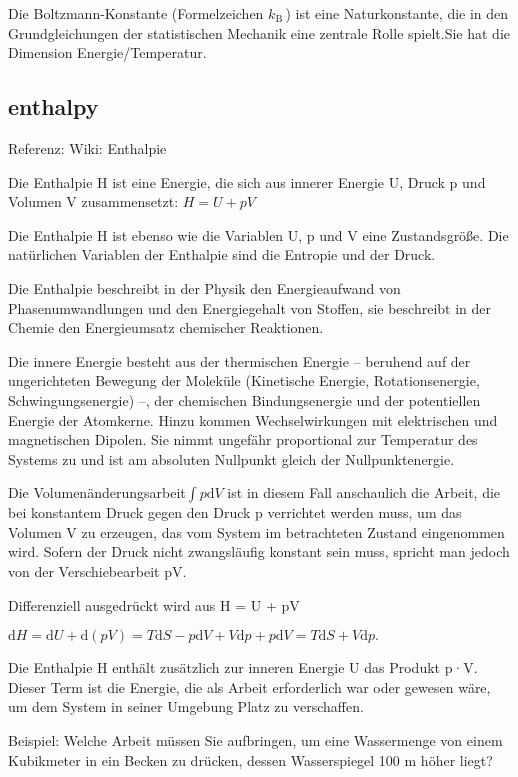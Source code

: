 \documentclass[]{article}
\begin{document}
Die Boltzmann-Konstante (Formelzeichen ${\displaystyle k_{\mathrm {B} }\,} $) ist eine Naturkonstante, die in den Grundgleichungen der statistischen Mechanik eine zentrale Rolle spielt.Sie hat die Dimension Energie/Temperatur.


\subsection*{enthalpy}
Referenz: Wiki: Enthalpie

Die Enthalpie H  ist eine Energie, die sich aus innerer Energie U, Druck p und Volumen V zusammensetzt:
$H = U + pV$

Die Enthalpie H ist ebenso wie die Variablen U, p und V eine Zustandsgröße. Die natürlichen Variablen der Enthalpie sind die Entropie und der Druck.

Die Enthalpie beschreibt in der Physik  den Energieaufwand von Phasenumwandlungen und den Energiegehalt von Stoffen, sie beschreibt in der Chemie den Energieumsatz chemischer Reaktionen.

Die innere Energie besteht aus der thermischen Energie – beruhend auf der ungerichteten Bewegung der Moleküle (Kinetische Energie, Rotationsenergie, Schwingungsenergie) –, der chemischen Bindungsenergie und der potentiellen Energie der Atomkerne. Hinzu kommen Wechselwirkungen mit elektrischen und magnetischen Dipolen. Sie nimmt ungefähr proportional zur Temperatur des Systems zu und ist am absoluten Nullpunkt gleich der Nullpunktenergie.

Die Volumenänderungsarbeit$ \int{p \mathrm dV}$ ist in diesem Fall anschaulich die Arbeit, die bei konstantem Druck gegen den Druck p verrichtet werden muss, um das Volumen V zu erzeugen, das vom System im betrachteten Zustand eingenommen wird. Sofern der Druck nicht zwangsläufig konstant sein muss, spricht man jedoch von der Verschiebearbeit pV.

Differenziell ausgedrückt wird aus H = U + pV

$\mathrm dH = \mathrm dU + \mathrm d(pV) = T \mathrm dS - p \mathrm dV + V \mathrm dp + p \mathrm dV = T\mathrm dS + V \mathrm dp. $

Die Enthalpie H enthält zusätzlich zur inneren Energie U das Produkt p·V. Dieser Term ist die Energie, die als Arbeit erforderlich war oder gewesen wäre, um dem System in seiner Umgebung Platz zu verschaffen.

Beispiel: Welche Arbeit müssen Sie aufbringen, um eine Wassermenge von einem Kubikmeter in ein Becken zu drücken, dessen Wasserspiegel 100 m höher liegt?
\end{document}
